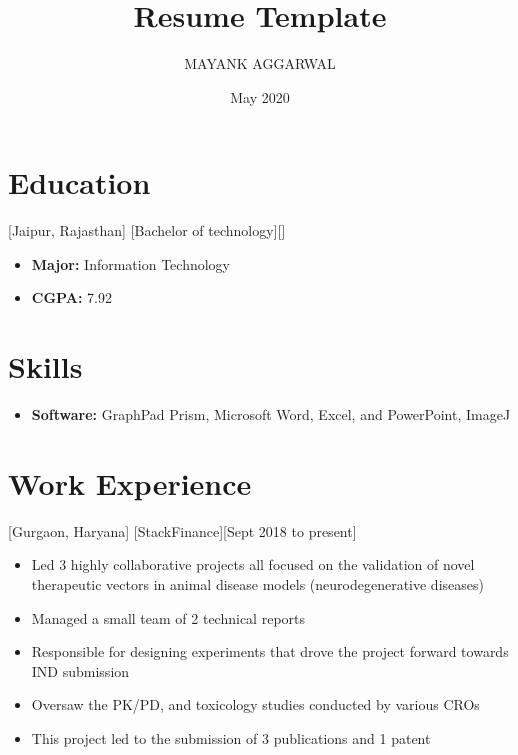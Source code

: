 \documentclass{article}
\title{Resume Template}
\author{MAYANK AGGARWAL}
\date{May 2020}
\begin{document}

    \makecvtitle %

    \section{Education}

    [Jaipur, Rajasthan]
    [Bachelor of technology][]
    \begin{itemize}
        \item \textbf{Major:} Information Technology
        \item \textbf{CGPA:} 7.92
    \end{itemize}

    \section{Skills}

    \begin{itemize}
        \item \textbf{Software:} GraphPad Prism, Microsoft Word, Excel, and PowerPoint, ImageJ
    \end{itemize}

    \section{Work Experience}

    [Gurgaon, Haryana]
    [StackFinance][Sept 2018 to present]

    \begin{itemize}
        \item Led 3 highly collaborative projects all focused on the validation of novel therapeutic vectors in animal disease models (neurodegenerative diseases)
        \item Managed a small team of 2 technical reports
        \item Responsible for designing experiments that drove the project forward towards IND submission
        \item Oversaw the PK/PD, and toxicology studies conducted by various CROs
        \item This project led to the submission of 3 publications and 1 patent
    \end{itemize}
\end{document}
